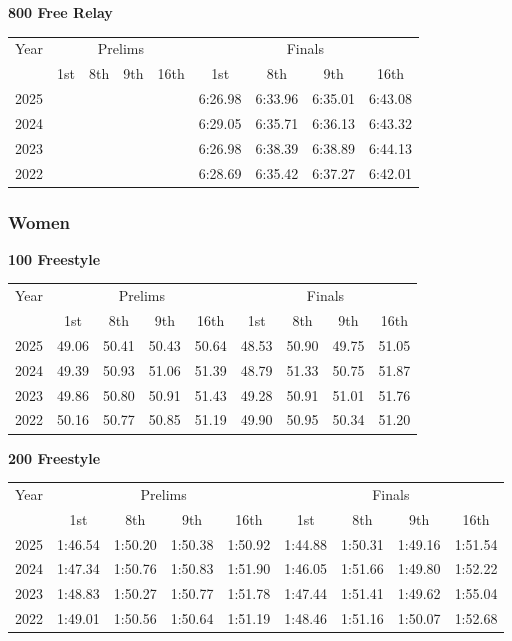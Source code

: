 \textbf{800 Free Relay}

\begin{flushleft}
\begin{tabular}{|c|c|c|c|c|c|c|c|c|}
\hline
Year & \multicolumn{4}{c|}{Prelims} & \multicolumn{4}{c|}{Finals} \\
\cline{2-9}
& 1st & 8th & 9th & 16th & 1st & 8th & 9th & 16th \\
\hline
2025 &  &  &  &  & 6:26.98 & 6:33.96 & 6:35.01 & 6:43.08 \\
2024 &  &  &  &  & 6:29.05 & 6:35.71 & 6:36.13 & 6:43.32 \\
2023 &  &  &  &  & 6:26.98 & 6:38.39 & 6:38.89 & 6:44.13 \\
2022 &  &  &  &  & 6:28.69 & 6:35.42 & 6:37.27 & 6:42.01 \\
\hline
\end{tabular}
\end{flushleft}

\clearpage
\subsubsection{Women}

\clearpage
\textbf{100 Freestyle}

\begin{flushleft}
\begin{tabular}{|c|c|c|c|c|c|c|c|c|}
\hline
Year & \multicolumn{4}{c|}{Prelims} & \multicolumn{4}{c|}{Finals} \\
\cline{2-9}
& 1st & 8th & 9th & 16th & 1st & 8th & 9th & 16th \\
\hline
2025 & 49.06 & 50.41 & 50.43 & 50.64 & 48.53 & 50.90 & 49.75 & 51.05 \\
2024 & 49.39 & 50.93 & 51.06 & 51.39 & 48.79 & 51.33 & 50.75 & 51.87 \\
2023 & 49.86 & 50.80 & 50.91 & 51.43 & 49.28 & 50.91 & 51.01 & 51.76 \\
2022 & 50.16 & 50.77 & 50.85 & 51.19 & 49.90 & 50.95 & 50.34 & 51.20 \\
\hline
\end{tabular}
\end{flushleft}

\textbf{200 Freestyle}

\begin{flushleft}
\begin{tabular}{|c|c|c|c|c|c|c|c|c|}
\hline
Year & \multicolumn{4}{c|}{Prelims} & \multicolumn{4}{c|}{Finals} \\
\cline{2-9}
& 1st & 8th & 9th & 16th & 1st & 8th & 9th & 16th \\
\hline
2025 & 1:46.54 & 1:50.20 & 1:50.38 & 1:50.92 & 1:44.88 & 1:50.31 & 1:49.16 & 1:51.54 \\
2024 & 1:47.34 & 1:50.76 & 1:50.83 & 1:51.90 & 1:46.05 & 1:51.66 & 1:49.80 & 1:52.22 \\
2023 & 1:48.83 & 1:50.27 & 1:50.77 & 1:51.78 & 1:47.44 & 1:51.41 & 1:49.62 & 1:55.04 \\
2022 & 1:49.01 & 1:50.56 & 1:50.64 & 1:51.19 & 1:48.46 & 1:51.16 & 1:50.07 & 1:52.68 \\
\hline
\end{tabular}
\end{flushleft}

